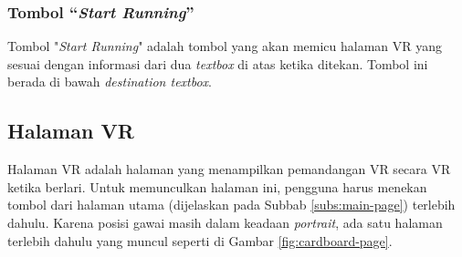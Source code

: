 \subsubsection{Tombol ``\textit{Start Running}''}
Tombol "\textit{Start Running}" adalah tombol yang akan memicu halaman VR yang sesuai dengan informasi dari dua \textit{textbox} di atas ketika ditekan. Tombol ini berada di bawah \textit{destination textbox}.

\subsection{Halaman VR}
Halaman VR adalah halaman yang menampilkan pemandangan VR secara VR ketika berlari. Untuk memunculkan halaman ini, pengguna harus menekan tombol dari halaman utama (dijelaskan pada Subbab \ref{subs:main-page}) terlebih dahulu. Karena posisi gawai masih dalam keadaan \textit{portrait}, ada satu halaman terlebih dahulu yang muncul seperti di Gambar \ref{fig:cardboard-page}. 

